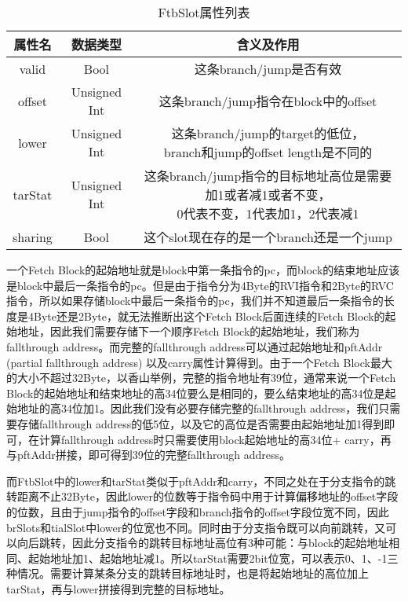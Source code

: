 \begin{table}[]
	\caption{FtbSlot属性列表}
	\label{tb:table2}
	\centering
	\begin{tabular}{|c|c|c|}
		\hline
		属性名   & 数据类型   & 含义及作用   \\ \hline
		valid & Bool & 这条branch/jump是否有效 \\ \hline
		offset & Unsigned Int & 这条branch/jump指令在block中的offset \\ \hline
		lower & Unsigned Int & \tabincell{c}{这条branch/jump的target的低位， \\ branch和jump的offset length是不同的} \\ \hline
		tarStat & Unsigned Int & \tabincell{c}{这条branch/jump指令的目标地址高位是需要加1或者减1或者不变， \\ 0代表不变，1代表加1，2代表减1} \\ \hline
		sharing & Bool & 这个slot现在存的是一个branch还是一个jump \\ \hline
	\end{tabular}
\end{table}

一个Fetch Block的起始地址就是block中第一条指令的pc，而block的结束地址应该是block中最后一条指令的pc。但是由于指令分为4Byte的RVI指令和2Byte的RVC指令，所以如果存储block中最后一条指令的pc，我们并不知道最后一条指令的长度是4Byte还是2Byte，就无法推断出这个Fetch Block后面连续的Fetch Block的起始地址，因此我们需要存储下一个顺序Fetch Block的起始地址，我们称为fallthrough address。而完整的fallthrough address可以通过起始地址和pftAddr (partial fallthrough address) 以及carry属性计算得到。由于一个Fetch Block最大的大小不超过32Byte，以香山举例，完整的指令地址有39位，通常来说一个Fetch Block的起始地址和结束地址的高34位要么是相同的，要么结束地址的高34位是起始地址的高34位加1。因此我们没有必要存储完整的fallthrough address，我们只需要存储fallthrough address的低5位，以及它的高位是否需要由起始地址加1得到即可，在计算fallthrough address时只需要使用block起始地址的高34位+ carry，再与pftAddr拼接，即可得到39位的完整fallthrough address。

而FtbSlot中的lower和tarStat类似于pftAddr和carry，不同之处在于分支指令的跳转距离不止32Byte，因此lower的位数等于指令码中用于计算偏移地址的offset字段的位数，且由于jump指令的offset字段和branch指令的offset字段位宽不同，因此brSlots和tialSlot中lower的位宽也不同。同时由于分支指令既可以向前跳转，又可以向后跳转，因此分支指令的跳转目标地址高位有3种可能：与block的起始地址相同、起始地址加1、起始地址减1。所以tarStat需要2bit位宽，可以表示0、1、-1三种情况。需要计算某条分支的跳转目标地址时，也是将起始地址的高位加上tarStat，再与lower拼接得到完整的目标地址。

